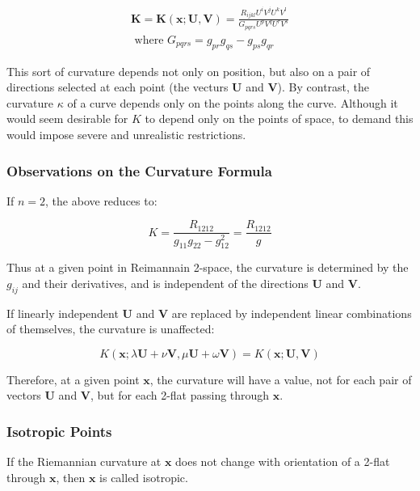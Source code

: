 \documentclass{article}
\begin{document}
\begin{align}
	\mathbf{ K } = \mathbf{ K }(\mathbf{ x };\mathbf{ U },\mathbf{ V }) = \frac{ R_{ijkl} U^i V^j U^k V^l }{ G_{pqrs} U^p V^q U^r V^s }\\
	\text{ where } G_{pqrs} = g_{pr} g_{qs} - g_{ps} g_{qr}
\end{align}

This sort of curvature depends not only on position, but also on a pair of directions selected at each point (the vecturs $\mathbf{ U }$ and $\mathbf{ V }$).  By contrast, the curvature $\kappa$ of a curve depends only on
the points along the curve.  Although it would seem desirable for $K$ to depend only on the points of space, to demand this would impose severe and unrealistic restrictions.

\subsubsection{Observations on the Curvature Formula}

If $n=2$, the above reduces to:

\begin{equation}
	K = \frac{ R_{1212} }{ g_{11}g_{22} - g^2_{12} } = \frac{ R_{1212} }{ g }
\end{equation}

\noindent Thus at a given point in Reimannain 2-space, the curvature is determined by the $g_{ij}$ and their derivatives, and is independent of the directions $\mathbf{ U }$ and $\mathbf{ V }$.

If linearly independent $\mathbf{ U }$ and $\mathbf{ V }$ are replaced by independent linear combinations of themselves, the curvature is unaffected:

\begin{equation}
	K( \mathbf{x };  \lambda \mathbf{ U } + \nu \mathbf{ V }, \mu \mathbf{ U } + \omega \mathbf{ V }) = K( \mathbf{ x }; \mathbf{ U }, \mathbf{ V })
\end{equation}

\noindent Therefore, at a given point $\mathbf{x}$, the curvature will have a value, not for each pair of vectors $\mathbf{ U }$ and $\mathbf{ V }$, but for each 2-flat passing through $\mathbf{ x }$.

\subsubsection{Isotropic Points}

If the Riemannian curvature at $\mathbf{x}$ does not change with orientation of a 2-flat through $\mathbf{x}$, then $\mathbf{x}$ is called isotropic.
\end{document}
